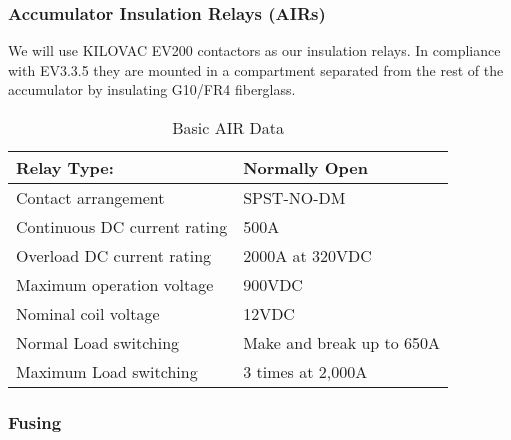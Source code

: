 \documentclass{article}
\begin{document}
\subsubsection{Accumulator Insulation Relays (AIRs)}
We will use KILOVAC EV200 contactors as our insulation relays. In compliance with EV3.3.5 they are mounted in a compartment separated from the rest of the accumulator by insulating G10/FR4 fiberglass. 


	\begin{table}[H]
	    \centering
	    \begin{tabular}{|l|l|}
	        \hline
	        Relay Type: & Normally Open \\ \hline
	        Contact arrangement & SPST-NO-DM \\ \hline
	        Continuous DC current rating & 500A \\ \hline
	        Overload DC current rating & 2000A at 320VDC\\ \hline
	        Maximum operation voltage & 900VDC \\ \hline
	        Nominal coil voltage & 12VDC \\ \hline
	        Normal Load switching & Make and break up to 650A \\ \hline
	        Maximum Load switching & 3 times at 2,000A \\ \hline
	    \end{tabular}
	    \caption{Basic AIR Data}
	    \label{air}
	\end{table}

\subsubsection{Fusing}
\end{document}
